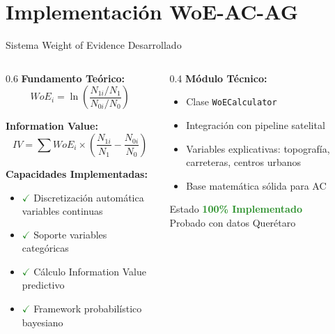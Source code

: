 \documentclass[aspectratio=169]{beamer}
\begin{document}
\section{Implementación WoE-AC-AG}

\begin{frame}{Sistema Weight of Evidence Desarrollado}
  \begin{columns}
    \begin{column}{0.6\textwidth}
      \textbf{Fundamento Teórico:}
      $$WoE_i = \ln\left(\frac{N_{1i}/N_1}{N_{0i}/N_0}\right)$$
      
      \textbf{Information Value:}
      $$IV = \sum WoE_i \times \left(\frac{N_{1i}}{N_1} - \frac{N_{0i}}{N_0}\right)$$
      
      \textbf{Capacidades Implementadas:}
      \begin{itemize}
        \item \textcolor{ForestGreen}{\textbf{$\checkmark$}} Discretización automática variables continuas
        \item \textcolor{ForestGreen}{\textbf{$\checkmark$}} Soporte variables categóricas  
        \item \textcolor{ForestGreen}{\textbf{$\checkmark$}} Cálculo Information Value predictivo
        \item \textcolor{ForestGreen}{\textbf{$\checkmark$}} Framework probabilístico bayesiano
      \end{itemize}
    \end{column}
    \begin{column}{0.4\textwidth}
      \textbf{Módulo Técnico:}
      \begin{itemize}
        \item Clase \texttt{WoECalculator}
        \item Integración con pipeline satelital
        \item Variables explicativas: topografía, carreteras, centros urbanos
        \item Base matemática sólida para AC
      \end{itemize}
      
      \vspace{0.3cm}
      \begin{alertblock}{Estado}
      \textcolor{ForestGreen}{\textbf{100\% Implementado}} \\
      Probado con datos Querétaro
      \end{alertblock}
    \end{column}
  \end{columns}
\end{frame}
\end{document}
